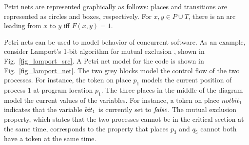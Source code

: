 
Petri nets are represented graphically as follows: places and transitions
are represented as circles and boxes, respectively. For $x, y \in P \cup T$,
there is an arc leading from $x$ to $y$ if{}f $F(x,y)=1$.




Petri nets can be used to model behavior of concurrent software. As an
example, consider Lamport's 1-bit
algorithm for mutual exclusion \cite{LamportJACM86}, shown in
Fig.~\ref{fig_lamport_src}. 
A Petri net model for the code is shown in Fig.~\ref{fig_lamport_net}.
The two grey blocks model the control flow of the two
processes. For instance, the token on place $p_1$ models the current
position of process 1 at program location $p_1$. The three places in the middle of the
diagram model the current values of the variables. For instance, a
token on place $notbit_1$ indicates that the variable ${\it bit}_1$ is currently
set to ${\it false}$.
The mutual exclusion property, which states that the two processes cannot be in the
critical section at the same time, corresponds to the property that
places $p_3$ and $q_5$ cannot both have a token at the same time.

